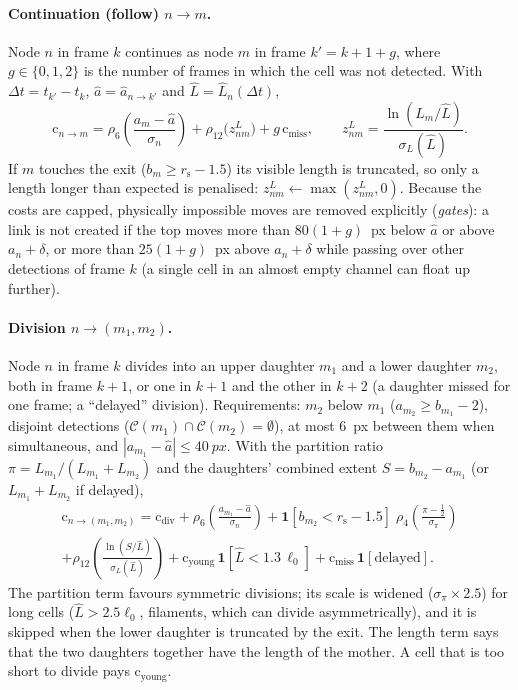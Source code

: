 \documentclass[11pt,a4paper]{article}
\newcommand{\rs}{r_{\mathrm{s}}}     %
\newcommand{\cost}{\mathrm{c}}
\newcommand{\ind}{\mathbf{1}}
\begin{document}
\paragraph{Continuation (follow) $n\to m$.} Node $n$ in frame $k$ continues as node $m$ in frame $k'=k+1+g$, where $g\in\{0,1,2\}$ is the number of frames in which the cell was not detected. With $\Delta t=t_{k'}-t_k$, $\hat a=\hat a_{n\to k'}$ and $\hat L=\hat L_n(\Delta t)$,
\begin{equation}
\cost_{n\to m}=\rho_{6}\!\left(\frac{a_m-\hat a}{\sigma_n}\right)+\rho_{12}\bigl(z^L_{nm}\bigr)+g\,\cost_{\mathrm{miss}},\qquad z^L_{nm}=\frac{\ln(L_m/\hat L)}{\sigma_L(\hat L)}.
\end{equation}
If $m$ touches the exit ($b_m\ge\rs-1.5$) its visible length is truncated, so only a length longer than expected is penalised: $z^L_{nm}\leftarrow\max(z^L_{nm},0)$. Because the costs are capped, physically impossible moves are removed explicitly (\emph{gates}): a link is not created if the top moves more than $80(1+g)$~px below $\hat a$ or above $a_n+\delta$, or more than $25(1+g)$~px above $a_n+\delta$ while passing over other detections of frame $k$ (a single cell in an almost empty channel can float up further).

\paragraph{Division $n\to(m_1,m_2)$.} Node $n$ in frame $k$ divides into an upper daughter $m_1$ and a lower daughter $m_2$, both in frame $k+1$, or one in $k+1$ and the other in $k+2$ (a daughter missed for one frame; a ``delayed'' division). Requirements: $m_2$ below $m_1$ ($a_{m_2}\ge b_{m_1}-2$), disjoint detections ($\mathcal C(m_1)\cap\mathcal C(m_2)=\emptyset$), at most \SI{6}{px} between them when simultaneous, and $|a_{m_1}-\hat a|\le\SI{40}{px}$. With the partition ratio $\pi=L_{m_1}/(L_{m_1}+L_{m_2})$ and the daughters' combined extent $S=b_{m_2}-a_{m_1}$ (or $L_{m_1}+L_{m_2}$ if delayed),
\begin{multline}
\cost_{n\to(m_1,m_2)}=\cost_{\mathrm{div}}+\rho_6\!\left(\frac{a_{m_1}-\hat a}{\sigma_n}\right)+\ind[b_{m_2}<\rs-1.5]\;\rho_4\!\left(\frac{\pi-\frac12}{\sigma_\pi}\right)\\
+\rho_{12}\!\left(\frac{\ln(S/\hat L)}{\sigma_L(\hat L)}\right)+\cost_{\mathrm{young}}\,\ind[\hat L<1.3\,\ell_0]+\cost_{\mathrm{miss}}\,\ind[\text{delayed}].
\end{multline}
The partition term favours symmetric divisions; its scale is widened ($\sigma_\pi\times2.5$) for long cells ($\hat L>2.5\ell_0$, filaments, which can divide asymmetrically), and it is skipped when the lower daughter is truncated by the exit. The length term says that the two daughters together have the length of the mother. A cell that is too short to divide pays $\cost_{\mathrm{young}}$.
\end{document}
